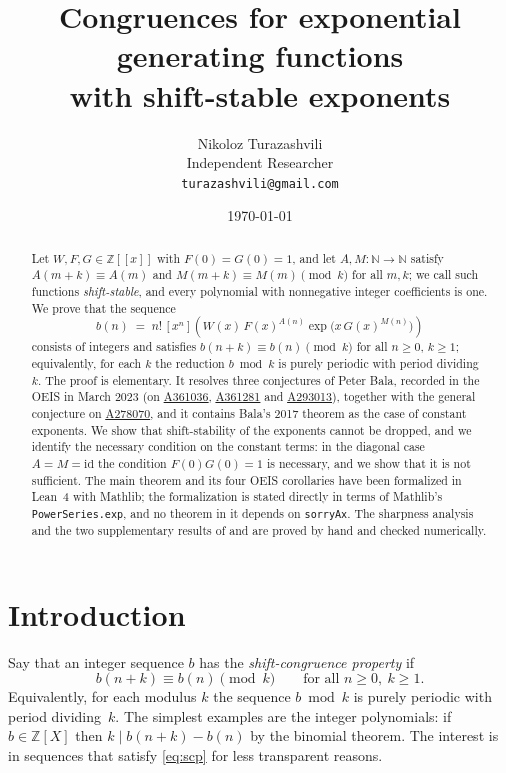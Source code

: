 \documentclass[11pt,a4paper]{article}
\title{Congruences for exponential generating functions\\ with shift-stable exponents}
\author{%
  Nikoloz Turazashvili\\
  \small Independent Researcher\\
  \small\texttt{turazashvili@gmail.com}%
}
\date{\today}
\theoremstyle{plain}
\theoremstyle{definition}
\newcommand{\N}{\mathbb{N}}
\newcommand{\Z}{\mathbb{Z}}
\newcommand{\coeff}[1]{[x^{#1}]}
\newcommand{\oeis}[1]{\href{https://oeis.org/#1}{\underline{#1}}}
\begin{document}
\maketitle

\begin{abstract}
Let $W,F,G\in\Z[[x]]$ with $F(0)=G(0)=1$, and let $A,M\colon\N\to\N$ satisfy
$A(m+k)\equiv A(m)$ and $M(m+k)\equiv M(m)\pmod{k}$ for all $m,k$; we call such
functions \emph{shift-stable}, and every polynomial with nonnegative integer
coefficients is one. We prove that the sequence
\[
  b(n)\;=\;n!\,\coeff{n}\!\left(W(x)\,F(x)^{A(n)}\exp\!\big(x\,G(x)^{M(n)}\big)\right)
\]
consists of integers and satisfies $b(n+k)\equiv b(n)\pmod{k}$ for all $n\ge0$, $k\ge1$;
equivalently, for each $k$ the reduction $b\bmod k$ is purely periodic with period
dividing $k$. The proof is elementary. It resolves three conjectures of Peter Bala,
recorded in the OEIS in March 2023 (on \oeis{A361036}, \oeis{A361281} and
\oeis{A293013}), together with the general conjecture on \oeis{A278070}, and it contains
Bala's 2017 theorem as the case of constant exponents. We show that shift-stability of
the exponents cannot be dropped, and we identify the necessary condition on the constant
terms: in the diagonal case $A=M=\mathrm{id}$ the condition $F(0)G(0)=1$ is necessary, and
we show that it is not sufficient. The main theorem and its four OEIS corollaries have
been formalized in
Lean~4 with Mathlib; the formalization is stated directly in terms of Mathlib's
\texttt{PowerSeries.exp}, and no theorem in it depends on \texttt{sorryAx}. The sharpness
analysis and the two supplementary results of  and  are
proved by hand and checked numerically.
\end{abstract}

\section{Introduction}

Say that an integer sequence $b$ has the \emph{shift-congruence property} if
\begin{equation}\label{eq:scp}
  b(n+k)\equiv b(n) \pmod{k}\qquad\text{for all }n\ge 0,\ k\ge 1 .
\end{equation}
Equivalently, for each modulus $k$ the sequence $b\bmod k$ is purely periodic with period
dividing~$k$. The simplest examples are the integer polynomials: if $b\in\Z[X]$ then
$k\mid b(n+k)-b(n)$ by the binomial theorem. The interest is in sequences that satisfy
\eqref{eq:scp} for less transparent reasons.
\end{document}
